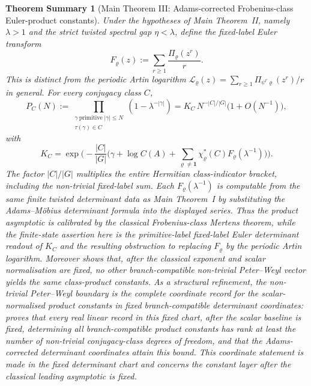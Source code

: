 \documentclass[11pt,a4paper]{amsart}
\theoremstyle{plain}
\newtheorem*{theoremsummary}{Theorem Summary}
\newcounter{theoremsummaryref}
\newcommand{\summaryrefstep}{\refstepcounter{theoremsummaryref}}
\theoremstyle{definition}
\theoremstyle{remark}
\begin{document}
\begin{theoremsummary}[Main Theorem III: Adams-corrected Frobenius-class Euler-product constants]
  \summaryrefstep\label{stmt:main-theorem-iii-adams-frobenius-products}
  \label{stmt:intro-adams-frobenius-products}
  Under the hypotheses of Main Theorem~II, namely \(\lambda>1\) and the strict
  twisted spectral gap \(\eta<\lambda\), define the fixed-label Euler transform
  \[
    F_\varrho(z):=\sum_{r\ge1}\frac{\Pi_\varrho(z^r)}{r}.
  \]
  This is distinct from the periodic Artin logarithm
  \(\mathcal L_\varrho(z)=\sum_{r\ge1}\Pi_{\psi^r\varrho}(z^r)/r\) in
  general.  For every conjugacy class \(C\),
  \[
    P_C(N):=
    \prod_{\substack{\gamma\ \mathrm{primitive}\; |\gamma|\le N\\
      \tau(\gamma)\in C}}
      (1-\lambda^{-|\gamma|})
    =K_C\,N^{-|C|/|G|}\bigl(1+O(N^{-1})\bigr),
  \]
  with
  \[
    K_C=\exp\biggl(-\frac{|C|}{|G|}
      \biggl(\gamma+\log C(A)+
        \sum_{\varrho\ne\mathbf1}\chi_\varrho^\ast(C)
          F_\varrho(\lambda^{-1})\biggr)\biggr).
  \]
  The factor \(|C|/|G|\) multiplies the entire Hermitian class-indicator
  bracket, including the non-trivial fixed-label sum.  Each
  \(F_\varrho(\lambda^{-1})\) is computable from the same finite
  twisted determinant data as Main Theorem~I by substituting the
  Adams--M\"obius determinant formula into the displayed series.  Thus
  the product asymptotic is calibrated by the classical Frobenius-class
  Mertens theorem, while the finite-state assertion here is the primitive-label
  fixed-label Euler determinant readout of \(K_C\) and the resulting
  obstruction to replacing \(F_\varrho\) by the periodic Artin logarithm.  Moreover
   shows that, after the
  classical exponent and scalar normalisation are fixed, no other
  branch-compatible non-trivial Peter--Weyl vector yields the same class-product
  constants.  As a structural refinement, the non-trivial
  Peter--Weyl boundary is the complete coordinate record for the
  scalar-normalised product constants in fixed branch-compatible determinant
  coordinates:
   proves that every
  real linear record in this fixed chart, after the scalar baseline is fixed,
  determining all branch-compatible product constants has rank
  at least the number of non-trivial conjugacy-class degrees of freedom,
  and that the Adams-corrected determinant coordinates attain this bound.
  This coordinate statement is made in the fixed determinant chart and concerns
  the constant layer after the classical leading asymptotic is fixed.


\end{theoremsummary}
\end{document}
